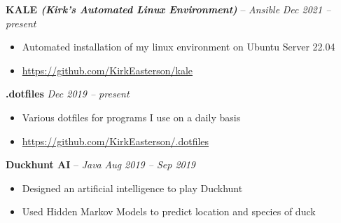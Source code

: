 \documentclass[10pt,letterpaper]{article}
\begin{document}
\spacedhrule{0.3em}{-0.5em}











\headedsection
{\textbf{KALE \textit{(Kirk's Automated Linux Environment)}} -- \textit{Ansible}}
{\textit{Dec 2021 -- present}} {
	\begin{itemize}[noitemsep,nolistsep]
		\item Automated installation of my linux environment on Ubuntu Server 22.04
		\item \url{https://github.com/KirkEasterson/kale}
	\end{itemize}
}


\headedsection
{\textbf{.dotfiles}}
{\textit{Dec 2019 -- present}} {
	\begin{itemize}[noitemsep,nolistsep]
		\item Various dotfiles for programs I use on a daily basis
		\item \url{https://github.com/KirkEasterson/.dotfiles}
	\end{itemize}
}


\headedsection
{\textbf{Duckhunt AI} -- \textit{Java}}
{\textit{Aug 2019 -- Sep 2019}} {
	\begin{itemize}[noitemsep,nolistsep]
		\item Designed an artificial intelligence to play Duckhunt
		\item Used Hidden Markov Models to predict location and species of duck
	\end{itemize}
}
\end{document}
